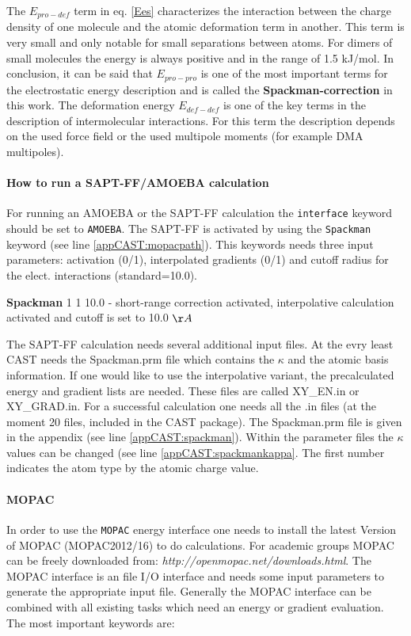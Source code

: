 \documentclass[a4paper,11pt]{scrartcl}
\begin{document}
The $E_{pro-def}$ term in eq. \ref{Ees} characterizes the interaction
between the charge density of one molecule and the atomic deformation
term in another. This term is very small and only notable for small
separations between atoms. For dimers of small molecules the energy
is always positive and in the range of 1.5 kJ/mol. In conclusion,
it can be said that $E_{pro-pro}$ is one of the most important terms
for the electrostatic energy description and is called the \textbf{Spackman-correction}
in this work. The deformation energy $E_{def-def}$ is one of
the key terms in the description of intermolecular interactions. For
this term the description depends on the used force field or the used
multipole moments (for example DMA multipoles).

\paragraph{How to run a SAPT-FF/AMOEBA calculation}

For running an AMOEBA or the SAPT-FF calculation the \texttt{interface} keyword should be set to \texttt{AMOEBA}. The SAPT-FF is activated by using the \texttt{Spackman} keyword (see line \ref{appCAST:mopacpath}). This keywords needs three input parameters: activation (0/1), interpolated gradients (0/1) and cutoff radius for the elect. interactions (standard=10.0).

\textbf{Spackman} 1 1 10.0 - short-range correction activated, interpolative calculation activated and cutoff is set to 10.0 $\AA$

The SAPT-FF calculation needs several additional input files. At the evry least CAST needs the Spackman.prm file which contains the $\kappa$ and the atomic basis information. If one would like to use the interpolative variant, the precalculated energy and gradient lists are needed. These files are called XY\_EN.in or XY\_GRAD.in. For a successful calculation one needs all the .in files (at the moment 20 files, included in the CAST package). The Spackman.prm file is given in the appendix (see line \ref{appCAST:spackman}). Within the parameter files the $\kappa$ values can be changed (see line \ref{appCAST:spackmankappa}. The first number indicates the atom type by the atomic charge value.


\paragraph{MOPAC}

In order to use the \texttt{MOPAC} energy interface one needs to install the latest Version of MOPAC (MOPAC2012/16) to do calculations. For academic groups MOPAC can be freely downloaded from: \textit{http://openmopac.net/downloads.html}. The MOPAC interface is an file I/O interface and needs some input parameters to generate the appropriate input file. Generally the MOPAC interface can be combined with all existing tasks which need an energy or gradient evaluation. The most important keywords are:
 
\end{document}
